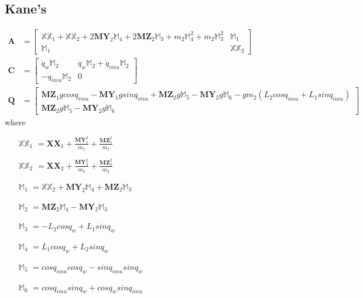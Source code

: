 \documentclass[a4paper,10pt]{article}
\begin{document}
\subsection{Kane's}
\begin{align}
  \mathbf{A} &= \left[ \begin{matrix} 
   \mathbb{XX}_1 + \mathbb{XX}_2 + 2 \mathbf{MY}_2 \mathbb{M}_4 + 2 \mathbf{MZ}_2 \mathbb{M}_3 + m_2 \mathbb{M}_4^2 + m_2 \mathbb{M}_3^2 & \mathbb{M}_1  \\
        \mathbb{M}_1   &                                                      \mathbb{XX}_2  
  \end{matrix} \right]  \\
 \mathbf{C} &= \left[ \begin{matrix}
  \dot{q}_w \mathbb{M}_2  & \dot{q}_w \mathbb{M}_2 + \dot{q}_{imu} \mathbb{M}_2  \\
                  -\dot{q}_{imu} \mathbb{M}_2              &                       0                              
 \end{matrix} \right]  \\
 \mathbf{Q} &= \left[ \begin{matrix}
  \mathbf{MZ}_1 g cosq_{imu} - \mathbf{MY}_1 g sinq_{imu} + \mathbf{MZ}_2 g \mathbb{M}_5 - \mathbf{MY}_2 g \mathbb{M}_6  - g m_2 (L_2 cosq_{imu} + L_1 sinq_{imu}) \\
                                                          \mathbf{MZ}_2 g \mathbb{M}_5 - \mathbf{MY}_2 g \mathbb{M}_6                                                          
 \end{matrix} \right]  
\end{align}
where
\begin{itemize}[label={}]
 \item[$\mathbb{XX}_1$] $= \mathbf{XX}_1 + \frac{\mathbf{MY}_1^2}{m_1} + \frac{\mathbf{MZ}_1^2}{m_1}$
 \item[$\mathbb{XX}_2$] $= \mathbf{XX}_2 + \frac{\mathbf{MY}_2^2}{m_2} + \frac{\mathbf{MZ}_2^2}{m_2}$
 \item[$\mathbb{M}_1$] $= \mathbb{XX}_2 + \mathbf{MY}_2 \mathbb{M}_4 + \mathbf{MZ}_2 \mathbb{M}_3$
 \item[$\mathbb{M}_2$] $= \mathbf{MZ}_2 \mathbb{M}_4 - \mathbf{MY}_2 \mathbb{M}_3 $
 \item[$\mathbb{M}_3$] $= - L_2 cosq_w + L_1 sinq_w$
 \item[$\mathbb{M}_4$] $=  L_1 cosq_w + L_2 sinq_w$
 \item[$\mathbb{M}_5$] $= cosq_{imu} cosq_w - sinq_{imu} sinq_w$
 \item[$\mathbb{M}_6$] $= cosq_{imu} sinq_w + cosq_w sinq_{imu}$
\end{itemize}
\end{document}
